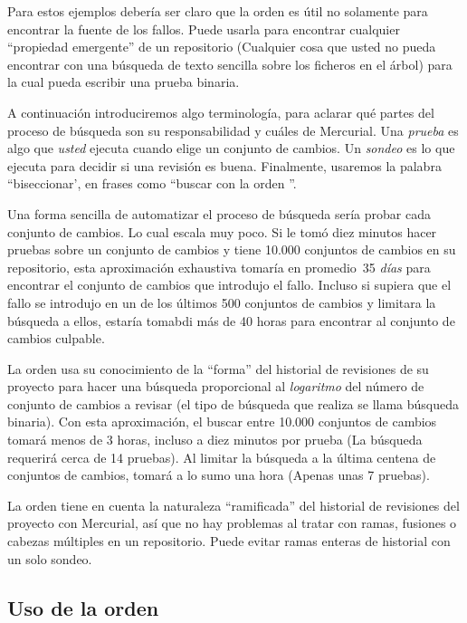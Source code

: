 Para estos ejemplos debería ser claro que la orden 
es útil no solamente para encontrar la fuente de los fallos. Puede
usarla para encontrar cualquier ``propiedad emergente'' de un
repositorio (Cualquier cosa que usted no pueda encontrar con una
búsqueda de texto sencilla sobre los ficheros en el árbol) para la
cual pueda escribir una prueba binaria.

A continuación introduciremos algo terminología, para aclarar qué
partes del proceso de búsqueda son su responsabilidad y cuáles de
Mercurial.  Una \emph{prueba} es algo que \emph{usted} ejecuta cuando
 elige un conjunto de cambios.  Un \emph{sondeo} es lo que
 ejecuta para decidir si una revisión es buena.  Finalmente,
usaremos la palabra ``biseccionar', en frases como ``buscar con la
orden ''.

Una forma sencilla de automatizar el proceso de búsqueda sería probar
cada conjunto de cambios.  Lo cual escala muy poco. Si le tomó diez
minutos hacer pruebas sobre un conjunto de cambios y tiene 10.000
conjuntos de cambios en su repositorio, esta aproximación exhaustiva
tomaría en promedio~35 \emph{días} para encontrar el conjunto de
cambios que introdujo el fallo. Incluso si supiera que el fallo se
introdujo en un de los últimos 500 conjuntos de cambios y limitara la
búsqueda a ellos, estaría tomabdi más de 40 horas para encontrar al
conjunto de cambios culpable.

La orden  usa su conocimiento de la ``forma'' del
historial de revisiones de su proyecto para hacer una búsqueda
proporcional al \emph{logaritmo} del número de conjunto de cambios a
revisar (el tipo de búsqueda que realiza se llama búsqueda
binaria). Con esta aproximación, el buscar entre 10.000 conjuntos de
cambios tomará menos de 3 horas, incluso a diez minutos por prueba (La
búsqueda requerirá cerca de 14 pruebas). Al limitar la búsqueda a la
última centena de conjuntos de cambios, tomará a lo sumo una
hora (Apenas unas 7 pruebas).

La orden  tiene en cuenta la naturaleza ``ramificada''
del historial de revisiones del proyecto con Mercurial, así que no
hay problemas al tratar con ramas, fusiones o cabezas múltiples en un
repositorio.  Puede evitar ramas enteras de historial con un solo
sondeo.

\subsection{Uso de la orden }

